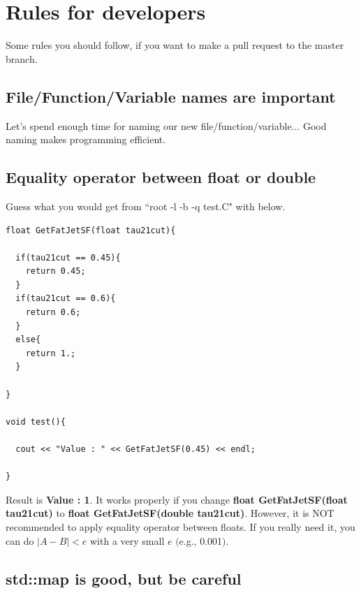 \documentclass[12pt, a4paper, titlepage]{article}
\begin{document}
\clearpage

\section{Rules for developers}

Some rules you should follow, if you want to make a pull request to the master branch.

\subsection{File/Function/Variable names are important}

Let's spend enough time for naming our new file/function/variable...
Good naming makes programming efficient.

\subsection{Equality operator between float or double}

Guess what you would get from ``root -l -b -q test.C" with below.

\begin{lstlisting}
float GetFatJetSF(float tau21cut){
  
  if(tau21cut == 0.45){
    return 0.45;
  }
  if(tau21cut == 0.6){
    return 0.6;
  }
  else{
    return 1.;
  }

}

void test(){

  cout << "Value : " << GetFatJetSF(0.45) << endl;

}

\end{lstlisting}

Result is \textbf{Value : 1}.
It works properly if you change \textbf{float GetFatJetSF(float tau21cut)} to \textbf{float GetFatJetSF(double tau21cut)}.
However, it is NOT recommended to apply equality operator between floats.
If you really need it, you can do $|A-B|<e$ with a very small $e$ $($e.g., 0.001$)$.

\subsection{std::map is good, but be careful}
\end{document}
